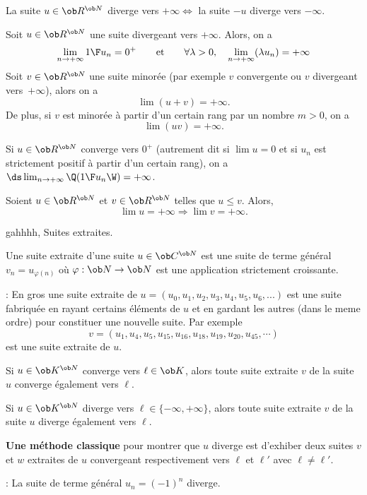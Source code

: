 \Propriete []  La suite $u\in\ob R^{\ob N}$ diverge vers $+\infty\Longleftrightarrow$ la suite $-u$ diverge vers $-\infty$. 
\bigskip

\Propriete []  Soit $u\in\ob R^{\ob N}$ une suite divergeant vers $+\infty$. Alors, on a 
$$
\lim_{n\to+\infty}{1\F u_n}=0^+\qquad\mbox{et}\qquad\forall \lambda> 0, \quad\lim_{n\to+\infty}(\lambda u_n)=+\infty
$$
Soit $v\in\ob R^{\ob N}$ une suite minor\'ee (par exemple $v$ convergente ou $v$ divergeant vers~$+\infty$), alors on a 
$$
\lim(u+v)=+\infty.
$$ 
De plus, si $v$ est minor\'ee \`a partir d'un certain rang par un nombre $m>0$, on a 
$$
\lim(uv)=+\infty.
$$

\Propriete []  Si $u\in\ob R^{\ob N}$ converge vers $0^+$ (autrement dit si $\lim u=0$ et si $u_n$ est strictement positif \`a partir d'un certain rang), on a $\ds\lim_{n\to+\infty}\Q({1\F u_n}\W)=+\infty$. 
\bigskip


\Propriete []  Soient $u\in\ob R^{\ob N}$ et $v\in\ob R^{\ob N}$ telles que $u\le v$. Alors, 
$$
\lim u=+\infty\Longrightarrow\lim v=+\infty.
$$

\Subsection gahhhh, Suites extraites. 


\Definition []  Une suite extraite d'une suite $u\in\ob C^{\ob N}$ est une suite de terme g\'en\'eral $v_n=u_{\varphi(n)}$ o\`u $\varphi:\ob N\to\ob N$ est une application strictement croissante. 
\bigskip

\Remarque : En gros une suite extraite de $u=(u_0,u_1,u_2,u_3,u_4,u_5,u_6,...)$ est une suite fabriqu\'ee en rayant certains \'el\'ements 
de $u$ et en gardant les autres (dans le meme ordre) pour constituer une nouvelle suite. Par exemple
$$
v=(u_1, u_4, u_5, u_{15}, u_{16}, u_{18}, u_{19}, u_{20}, u_{45}, \cdots)
$$
est une suite extraite de $u$. 
\bigskip

\Propriete []  Si $u\in\ob K^{\ob N}$ converge vers $\ell\in\ob K$, alors toute suite extraite $v$ de la suite $u$ converge \'egalement vers $\ell$. 
\bigskip


\Propriete []  Si $u\in\ob K^{\ob N}$ diverge vers $\ell\in\{-\infty,+\infty\}$, alors toute suite extraite $v$ de la suite $u$ diverge \'egalement vers $\ell$. 
\bigskip

{\bf Une m\'ethode classique} pour montrer que $u$ diverge 
est d'exhiber deux suites $v$ et $w$ extraites de $u$ convergeant respectivement vers $\ell$ et $\ell'$ avec $\ell\neq\ell'$. 
\bigskip

\Application : La suite de terme g\'en\'eral $u_n=(-1)^n$ diverge. 


